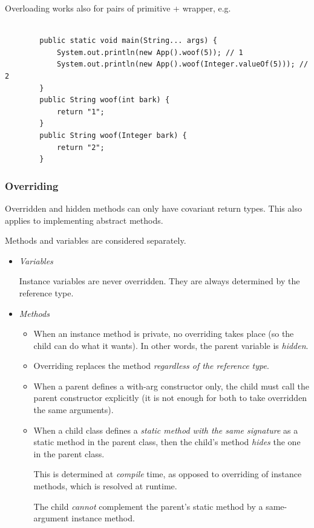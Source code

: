 \documentclass{scrartcl}
\begin{document}
    Overloading works also for pairs of primitive + wrapper, e.g.

    \begin{lstlisting}

        public static void main(String... args) {
            System.out.println(new App().woof(5)); // 1
            System.out.println(new App().woof(Integer.valueOf(5))); // 2
        }
        public String woof(int bark) {
            return "1";
        }
        public String woof(Integer bark) {
            return "2";
        }
    \end{lstlisting}

\subsubsection{Overriding}

    Overridden and hidden methods can only have covariant return types.
    This also applies to implementing abstract methods.

    Methods and variables are considered separately.

    \begin{itemize}
        \item \textit{Variables}

        Instance variables are never overridden. They are always determined by the reference type.

        \item \textit{Methods}

        \begin{itemize}
            \item
            When an instance method is private, no overriding takes place (so the child can do what it wants). In other words, the parent variable is \textit{hidden}.

             \item
            Overriding replaces the method \textit{regardless of the reference type}.

             \item
            When a parent defines a with-arg constructor only, the child must call the parent constructor
            explicitly (it is not enough for both to take overridden the same arguments).

            \item
            When a child class defines a \textit{static method with the same signature} as a static method in the parent class, then the child’s method \textit{hides} the one in the parent class.

            This is determined at \textit{compile} time, as opposed to overriding of instance methods, which is resolved at runtime.

            The child \textit{cannot} complement the parent's static method
            by a same-argument instance method.
        \end{itemize}



    \end{itemize}
\end{document}
